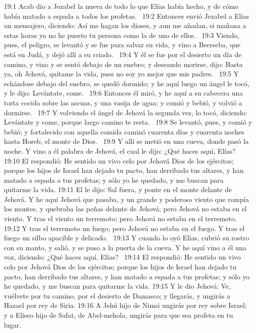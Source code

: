 19:1 Acab dio a Jezabel la nueva de todo lo que Elías había hecho, y de cómo había matado a espada a todos los profetas.  
19:2 Entonces envió Jezabel a Elías un mensajero, diciendo: Así me hagan los dioses, y aun me añadan, si mañana a estas horas yo no he puesto tu persona como la de uno de ellos.  
19:3 Viendo, pues, el peligro, se levantó y se fue para salvar su vida, y vino a Beerseba, que está en Judá, y dejó allí a su criado.  
19:4 Y él se fue por el desierto un día de camino, y vino y se sentó debajo de un enebro; y deseando morirse, dijo: Basta ya, oh Jehová, quítame la vida, pues no soy yo mejor que mis padres.  
19:5 Y echándose debajo del enebro, se quedó dormido; y he aquí luego un ángel le tocó, y le dijo: Levántate, come.  
19:6 Entonces él miró, y he aquí a su cabecera una torta cocida sobre las ascuas, y una vasija de agua; y comió y bebió, y volvió a dormirse.  
19:7 Y volviendo el ángel de Jehová la segunda vez, lo tocó, diciendo: Levántate y come, porque largo camino te resta.  
19:8 Se levantó, pues, y comió y bebió; y fortalecido con aquella comida caminó cuarenta días y cuarenta noches hasta Horeb, el monte de Dios.  
19:9 Y allí se metió en una cueva, donde pasó la noche. Y vino a él palabra de Jehová, el cual le dijo: ¿Qué haces aquí, Elías?  
19:10 El respondió: He sentido un vivo celo por Jehová Dios de los ejércitos; porque los hijos de Israel han dejado tu pacto, han derribado tus altares, y han matado a espada a tus profetas; y sólo yo he quedado, y me buscan para quitarme la vida. 
19:11 El le dijo: Sal fuera, y ponte en el monte delante de Jehová. Y he aquí Jehová que pasaba, y un grande y poderoso viento que rompía los montes, y quebraba las peñas delante de Jehová; pero Jehová no estaba en el viento. Y tras el viento un terremoto; pero Jehová no estaba en el terremoto.  
19:12 Y tras el terremoto un fuego; pero Jehová no estaba en el fuego. Y tras el fuego un silbo apacible y delicado.  
19:13 Y cuando lo oyó Elías, cubrió su rostro con su manto, y salió, y se puso a la puerta de la cueva. Y he aquí vino a él una voz, diciendo: ¿Qué haces aquí, Elías?  
19:14 El respondió: He sentido un vivo celo por Jehová Dios de los ejércitos; porque los hijos de Israel han dejado tu pacto, han derribado tus altares, y han matado a espada a tus profetas; y sólo yo he quedado, y me buscan para quitarme la vida. 
19:15 Y le dio Jehová: Ve, vuélvete por tu camino, por el desierto de Damasco; y llegarás, y ungirás a Hazael por rey de Siria. 
19:16 A Jehú hijo de Nimsi ungirás por rey sobre Israel; y a Eliseo hijo de Safat, de Abel-mehola, ungirás para que sea profeta en tu lugar.  
